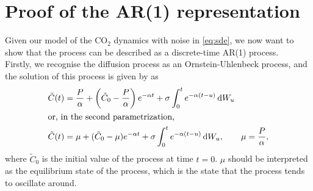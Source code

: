 \chapter{Proof of the AR(1) representation}
\label{app:ar1-proof}

Given our model of the $\text{CO}_2$ dynamics with noise in \cref{eq:sde},
we now want to show that the process can be described as a discrete-time AR(1) process. \\
Firstly, we recognise the diffusion process as an Ornstein-Uhlenbeck process, and the solution
of this process is given by \textcite[Sec.~1.13.1]{iacus2008} as 
\begin{subequations}\label{eq:ou-solution}
\begin{align}
\tilde{C}(t) &= \frac{P}{\alpha}
      + \left( \tilde{C}_0 - \frac{P}{\alpha} \right) e^{-\alpha t}
      + \sigma \int_0^t e^{-\alpha (t-u)} \, \mathrm{d}W_u
      \label{eq:ou-param1} \\
\intertext{or, in the second parametrization,}
\tilde{C}(t) &= \mu + (\tilde{C}_0 - \mu) e^{-\alpha t}
      + \sigma \int_0^t e^{-\alpha (t-u)} \, \mathrm{d}W_u ,
      \qquad \mu = \frac{P}{\alpha},
      \label{eq:ou-param2}
\end{align}
\end{subequations}
where $\tilde{C}_0$ is the initial value of the process at time $t = 0$. $\mu$ should be interpreted
as the equilibrium state of the process, which is the state that the process tends to oscillate around.


\bigskip

